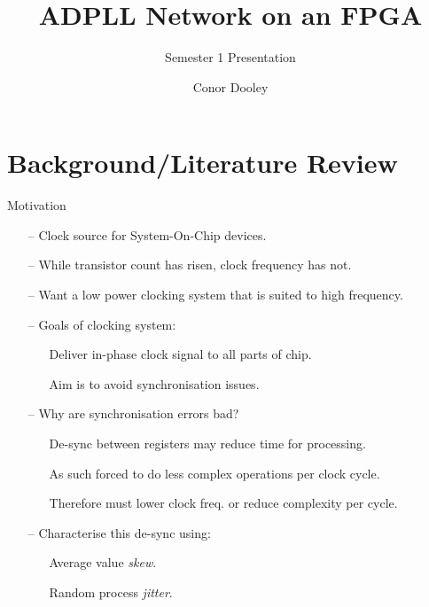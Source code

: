 \documentclass{beamer}
\title{ADPLL Network on an FPGA}
\author{Conor Dooley}
\subtitle{Semester 1 Presentation}
\begin{document}
\begin{frame}
    \titlepage
\end{frame}

\section*{Background/Literature Review}
\begin{frame}{Motivation}

    \begin{itemize}
        \item[--]
            Clock source for System-On-Chip devices.
        \item[--]
        	While transistor count has risen, clock frequency has not.
        \item[--]
        	Want a low power clocking system that is suited to high frequency.
        \item[--]
            Goals of clocking system:
            \begin{itemize}
            	\item[]
            		Deliver in-phase clock signal to all parts of chip.
		        \item[]
		            Aim is to avoid synchronisation issues.
		    \end{itemize}
        \item[--]
            Why are synchronisation errors bad?
        \begin{itemize}
        	\item[]
        		De-sync between registers may reduce time for processing.
            \item[]
                As such forced to do less complex operations per clock cycle.
            \item[]
                Therefore must lower clock freq. or reduce complexity per cycle.
        \end{itemize}
    	\item[--]
    		Characterise this de-sync using:
    		\begin{itemize}
    			\item[]
    				Average value \textit{skew}.
    			\item[]
	    			Random process \textit{jitter}.
    		\end{itemize}
    \end{itemize}
 
\end{frame}
\end{document}
